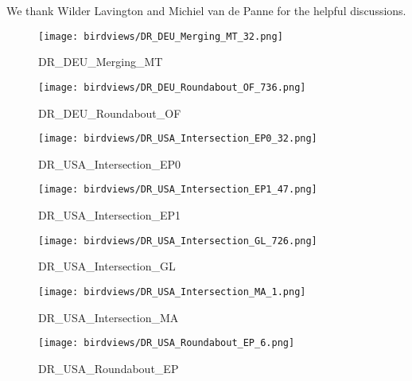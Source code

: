 \documentclass[letterpaper, 10 pt, conference]{ieeeconf}
\begin{document}
We thank Wilder Lavington and Michiel van de Panne for the helpful discussions.

\addtolength{\textheight}{-7cm}   










\clearpage

\begin{figure*}[t]
    \centering
    \begin{subfigure}[b]{0.31\textwidth}
        \centering
        \texttt{[image: birdviews/DR\_DEU\_Merging\_MT\_32.png]}
        \caption{DR\_DEU\_Merging\_MT}
    \end{subfigure}
    \hfill
    \begin{subfigure}[b]{0.31\textwidth}
        \centering
        \texttt{[image: birdviews/DR\_DEU\_Roundabout\_OF\_736.png]}
        \caption{DR\_DEU\_Roundabout\_OF}
    \end{subfigure}
    \hfill
    \begin{subfigure}[b]{0.31\textwidth}
        \centering
        \texttt{[image: birdviews/DR\_USA\_Intersection\_EP0\_32.png]}
        \caption{DR\_USA\_Intersection\_EP0}
    \end{subfigure}
    \hfill
    \begin{subfigure}[b]{0.31\textwidth}
        \centering
        \texttt{[image: birdviews/DR\_USA\_Intersection\_EP1\_47.png]}
        \caption{DR\_USA\_Intersection\_EP1}
    \end{subfigure}
    \hfill
    \begin{subfigure}[b]{0.31\textwidth}
        \centering
        \texttt{[image: birdviews/DR\_USA\_Intersection\_GL\_726.png]}
        \caption{DR\_USA\_Intersection\_GL}
    \end{subfigure}
    \hfill
    \begin{subfigure}[b]{0.31\textwidth}
        \centering
        \texttt{[image: birdviews/DR\_USA\_Intersection\_MA\_1.png]}
        \caption{DR\_USA\_Intersection\_MA}
    \end{subfigure}
    \hfill
    \begin{subfigure}[b]{0.31\textwidth}
        \centering
        \texttt{[image: birdviews/DR\_USA\_Roundabout\_EP\_6.png]}
        \caption{DR\_USA\_Roundabout\_EP}
    \end{subfigure}

\end{figure*}
\end{document}
